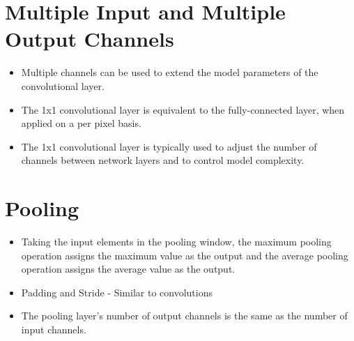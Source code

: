 \documentclass[12pt,notitlepage]{article}
\begin{document}
\section{Multiple Input and Multiple Output Channels}
\begin{itemize}
    \item Multiple channels can be used to extend the model parameters of the convolutional layer.
    \item The  1x1  convolutional layer is equivalent to the fully-connected layer, when applied on a per pixel basis.
    \item The  1x1  convolutional layer is typically used to adjust the number of channels between network layers and to control model complexity.
\end{itemize}

\section{Pooling}
\begin{itemize}
    \item Taking the input elements in the pooling window, the maximum pooling operation assigns the maximum value as the output and the average pooling operation assigns the average value as the output.
    \item Padding and Stride - Similar to convolutions
    \item The pooling layer’s number of output channels is the same as the number of input channels.
\end{itemize}



\vfill

\nocite{zhang2020dive}
\end{document}
